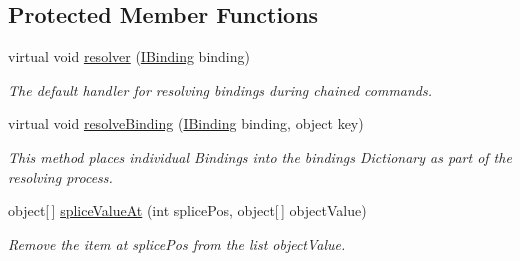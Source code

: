\subsection*{Protected Member Functions}
\begin{DoxyCompactItemize}
\item 
\hypertarget{classstrange_1_1framework_1_1impl_1_1_binder_a8f463a4edc3e3bbdaac51a8aaa5d240f}{virtual void \hyperlink{classstrange_1_1framework_1_1impl_1_1_binder_a8f463a4edc3e3bbdaac51a8aaa5d240f}{resolver} (\hyperlink{interfacestrange_1_1framework_1_1api_1_1_i_binding}{I\-Binding} binding)}\label{classstrange_1_1framework_1_1impl_1_1_binder_a8f463a4edc3e3bbdaac51a8aaa5d240f}

\begin{DoxyCompactList}\small\item\em The default handler for resolving bindings during chained commands. \end{DoxyCompactList}\item 
virtual void \hyperlink{classstrange_1_1framework_1_1impl_1_1_binder_a376bc9c4030c38eeb12818cc92fdcd5f}{resolve\-Binding} (\hyperlink{interfacestrange_1_1framework_1_1api_1_1_i_binding}{I\-Binding} binding, object key)
\begin{DoxyCompactList}\small\item\em This method places individual Bindings into the bindings Dictionary as part of the resolving process. \end{DoxyCompactList}\item 
\hypertarget{classstrange_1_1framework_1_1impl_1_1_binder_a349b12bdc879e7f465a7cf7dfeb3b5b4}{object\mbox{[}$\,$\mbox{]} \hyperlink{classstrange_1_1framework_1_1impl_1_1_binder_a349b12bdc879e7f465a7cf7dfeb3b5b4}{splice\-Value\-At} (int splice\-Pos, object\mbox{[}$\,$\mbox{]} object\-Value)}\label{classstrange_1_1framework_1_1impl_1_1_binder_a349b12bdc879e7f465a7cf7dfeb3b5b4}

\begin{DoxyCompactList}\small\item\em Remove the item at splice\-Pos from the list object\-Value. \end{DoxyCompactList}\end{DoxyCompactItemize}
